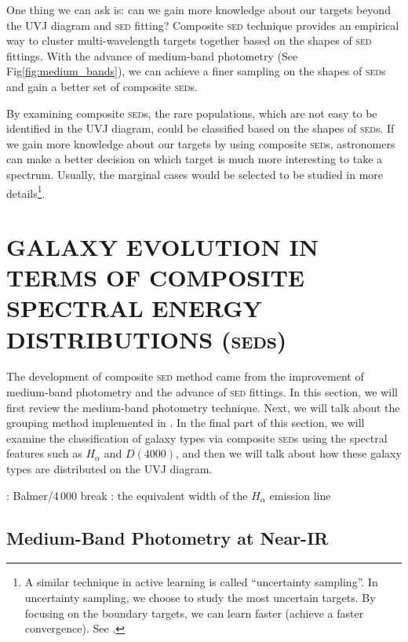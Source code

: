\documentclass{ar-1col}
\begin{document}
One thing we can ask is: can we gain more knowledge about our targets beyond the UVJ diagram and \textsc{sed} fitting?
Composite \textsc{sed} technique \citep{Kriek2011, Forrest2018} provides an empirical way to cluster multi-wavelength targets together based on the shapes of \textsc{sed} fittings.
With the advance of medium-band photometry (See Fig\ref{fig:medium_bands}), we can achieve a finer sampling on the shapes of \textsc{sed}s and gain a better set of composite \textsc{sed}s.

By examining composite \textsc{sed}s, the rare populations, which are not easy to be identified in the UVJ diagram, could be classified based on the shapes of \textsc{sed}s.
If we gain more knowledge about our targets by using composite \textsc{sed}s, astronomers can make a better decision on which target is much more interesting to take a spectrum.
Usually, the marginal cases would be selected to be studied in more details\footnote{A similar technique in active learning is called ``uncertainty sampling''. In uncertainty sampling, we choose to study the most uncertain targets. By focusing on the boundary targets, we can learn faster (achieve a faster convergence). See \citet{Garnett18}.}.


\section{GALAXY EVOLUTION IN TERMS OF COMPOSITE SPECTRAL ENERGY DISTRIBUTIONS (\textsc{sed}s)}

The development of composite \textsc{sed} method came from the improvement of medium-band photometry and the advance of \textsc{sed} fittings. 
In this section, we will first review the medium-band photometry technique.
Next, we will talk about the grouping method implemented in \citet{Kriek2011, Forrest2018}.
In the final part of this section, we will examine the classification of galaxy types via composite \textsc{sed}s using the spectral features such as $H_\alpha$ and $D(4000)$, and then we will talk about how these galaxy types are distributed on the UVJ diagram.

\begin{marginnote}
     : Balmer/4\,000 break
    : the equivalent width of the $H_\alpha$ emission line 
\end{marginnote}

\subsection{Medium-Band Photometry at Near-IR}
\end{document}
